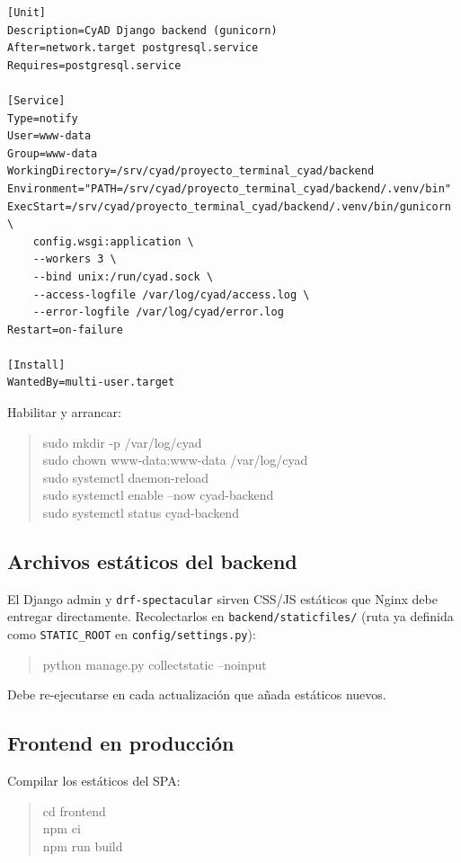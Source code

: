 \documentclass{computacion}
\begin{document}
\begin{Verbatim}[fontsize=\small, frame=single]
[Unit]
Description=CyAD Django backend (gunicorn)
After=network.target postgresql.service
Requires=postgresql.service

[Service]
Type=notify
User=www-data
Group=www-data
WorkingDirectory=/srv/cyad/proyecto_terminal_cyad/backend
Environment="PATH=/srv/cyad/proyecto_terminal_cyad/backend/.venv/bin"
ExecStart=/srv/cyad/proyecto_terminal_cyad/backend/.venv/bin/gunicorn \
    config.wsgi:application \
    --workers 3 \
    --bind unix:/run/cyad.sock \
    --access-logfile /var/log/cyad/access.log \
    --error-logfile /var/log/cyad/error.log
Restart=on-failure

[Install]
WantedBy=multi-user.target
\end{Verbatim}

Habilitar y arrancar:

\begin{quote}\ttfamily
sudo mkdir -p /var/log/cyad \\
sudo chown www-data:www-data /var/log/cyad \\
sudo systemctl daemon-reload \\
sudo systemctl enable --now cyad-backend \\
sudo systemctl status cyad-backend
\end{quote}

\subsection{Archivos estáticos del backend}

El Django admin y \texttt{drf-spectacular} sirven CSS/JS estáticos que Nginx debe entregar directamente. Recolectarlos en \texttt{backend/staticfiles/} (ruta ya definida como \texttt{STATIC\_ROOT} en \texttt{config/settings.py}):

\begin{quote}\ttfamily
python manage.py collectstatic --noinput
\end{quote}

Debe re-ejecutarse en cada actualización que añada estáticos nuevos.

\subsection{Frontend en producción}

Compilar los estáticos del SPA:

\begin{quote}\ttfamily
cd frontend \\
npm ci \\
npm run build
\end{quote}
\end{document}
